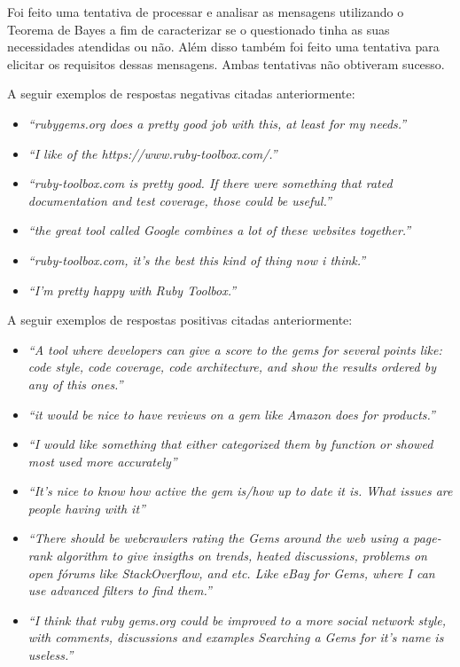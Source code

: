Foi feito uma tentativa de processar e analisar as mensagens utilizando o Teorema de Bayes a fim de caracterizar se o questionado tinha as suas necessidades atendidas ou não. Além disso também foi feito uma tentativa para elicitar os requisitos dessas mensagens. Ambas tentativas não obtiveram sucesso.

A seguir exemplos de respostas negativas citadas anteriormente: 

\begin{itemize}
	\item \textit{``rubygems.org does a pretty good job with this, at least for my needs.''}
    \item \textit{``I like of the https://www.ruby-toolbox.com/.''}
    \item \textit{``ruby-toolbox.com is pretty good. If there were something that rated documentation and test coverage, those could be useful.''}
    \item \textit{``the great tool called Google combines a lot of these websites together.''}
    \item \textit{``ruby-toolbox.com, it's the best this kind of thing now i think.''}
    \item \textit{``I'm pretty happy with Ruby Toolbox.''}
\end{itemize}

A seguir exemplos de respostas positivas citadas anteriormente: 

\begin{itemize}
	\item \textit{``A tool where developers can give a score to the gems for several points like: code style, code coverage, code architecture, and show the results ordered by any of this ones.''}
    \item \textit{``it would be nice to have reviews on a gem like Amazon does for products.''}
    \item \textit{``I would like something that either categorized them by function or showed most used more accurately''}
    \item \textit{``It's nice to know how active the gem is/how up to date it is.  What issues are people having with it''}
    \item \textit{``There should be webcrawlers rating the Gems around the web using a page-rank algorithm to give insigths on trends, heated discussions, problems on open fórums like StackOverflow, and etc. Like eBay for Gems, where I can use advanced filters to find them.''}
    \item \textit{``I think that ruby gems.org could be improved to a more social network style, with comments, discussions and examples
Searching a Gems for it's name is useless.''}
\end{itemize}

